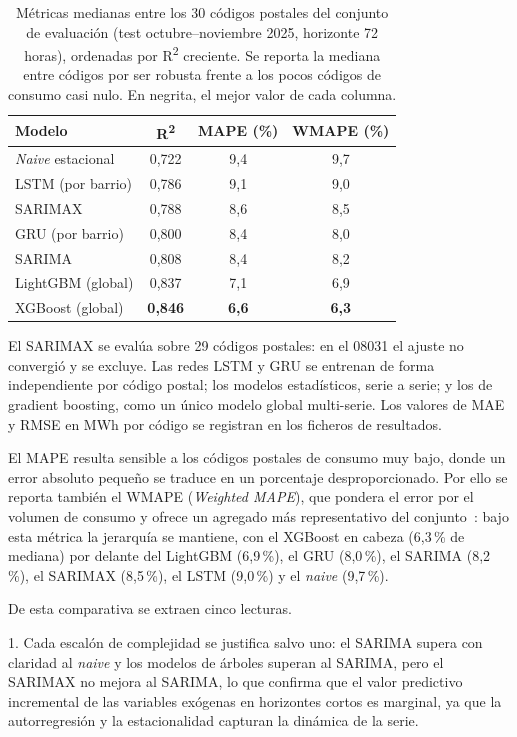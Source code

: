 \documentclass[12pt, a4paper]{article}
\begin{document}
\begin{table}[H]
\centering
\caption{Métricas medianas entre los 30 códigos postales del conjunto de evaluación (test octubre--noviembre 2025, horizonte 72 horas), ordenadas por R\textsuperscript{2} creciente. Se reporta la mediana entre códigos por ser robusta frente a los pocos códigos de consumo casi nulo. En negrita, el mejor valor de cada columna.}
\label{tab:comparativa}
\begin{tabular}{lccc}
\toprule
Modelo & R\textsuperscript{2} & MAPE (\%) & WMAPE (\%) \\
\midrule
\textit{Naive} estacional & 0,722 & 9,4 & 9,7 \\
LSTM (por barrio) & 0,786 & 9,1 & 9,0 \\
SARIMAX & 0,788 & 8,6 & 8,5 \\
GRU (por barrio) & 0,800 & 8,4 & 8,0 \\
SARIMA & 0,808 & 8,4 & 8,2 \\
LightGBM (global) & 0,837 & 7,1 & 6,9 \\
XGBoost (global) & \textbf{0,846} & \textbf{6,6} & \textbf{6,3} \\
\bottomrule
\end{tabular}

\vspace{4pt}
{\footnotesize\raggedright El SARIMAX se evalúa sobre 29 códigos postales: en el 08031 el ajuste no convergió y se excluye. Las redes LSTM y GRU se entrenan de forma independiente por código postal; los modelos estadísticos, serie a serie; y los de gradient boosting, como un único modelo global multi-serie. Los valores de MAE y RMSE en MWh por código se registran en los ficheros de resultados.\par}
\end{table}

El MAPE resulta sensible a los códigos postales de consumo muy bajo, donde un error absoluto pequeño se traduce en un porcentaje desproporcionado. Por ello se reporta también el WMAPE (\textit{Weighted MAPE}), que pondera el error por el volumen de consumo y ofrece un agregado más representativo del conjunto~\cite{hyndman2021}: bajo esta métrica la jerarquía se mantiene, con el XGBoost en cabeza (6,3\,\% de mediana) por delante del LightGBM (6,9\,\%), el GRU (8,0\,\%), el SARIMA (8,2\,\%), el SARIMAX (8,5\,\%), el LSTM (9,0\,\%) y el \textit{naive} (9,7\,\%).

De esta comparativa se extraen cinco lecturas. 

1. Cada escalón de complejidad se justifica salvo uno: el SARIMA supera con claridad al \textit{naive} y los modelos de árboles superan al SARIMA, pero el SARIMAX no mejora al SARIMA, lo que confirma que el valor predictivo incremental de las variables exógenas en horizontes cortos es marginal, ya que la autorregresión y la estacionalidad capturan la dinámica de la serie. 
\end{document}
